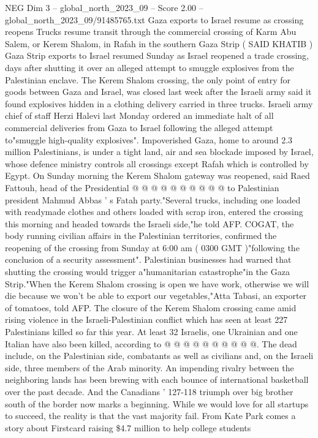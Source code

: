 \begin{textsample}{NEG Dim 3 – global\_north\_2023\_09 – Score 2.00 – global\_north\_2023\_09/91485765.txt}  \label{ex:f3_neg_410}
Gaza exports to Israel resume as crossing reopens Trucks resume transit through the commercial crossing of Karm Abu Salem, or Kerem Shalom, in Rafah in the southern Gaza Strip ( SAID KHATIB ) Gaza Strip exports to Israel resumed Sunday as Israel reopened a trade crossing, days after shutting it over an alleged attempt to smuggle explosives from the Palestinian enclave.
The Kerem Shalom crossing, the only point of entry for goods between Gaza and Israel, was closed last week after the Israeli army said it found explosives hidden in a clothing delivery carried in three trucks.
Israeli army chief of staff Herzi Halevi last Monday ordered an immediate halt of all commercial deliveries from Gaza to Israel following the alleged attempt to"smuggle high-quality explosives".
Impoverished Gaza, home to around 2.3 million Palestinians, is under a tight land, air and sea blockade imposed by Israel, whose defence ministry controls all crossings except Rafah which is controlled by Egypt.
On Sunday morning the Kerem Shalom gateway was reopened, said Raed Fattouh, head of the Presidential @ @ @ @ @ @ @ @ @ @ to Palestinian president Mahmud Abbas ' s Fatah party."Several trucks, including one loaded with readymade clothes and others loaded with scrap iron, entered the crossing this morning and headed towards the Israeli side,"he told AFP.
COGAT, the body running civilian affairs in the Palestinian territories, confirmed the reopening of the crossing from Sunday at 6:00 am ( 0300 GMT )"following the conclusion of a security assessment".
Palestinian businesses had warned that shutting the crossing would trigger a"humanitarian catastrophe"in the Gaza Strip."When the Kerem Shalom crossing is open we have work, otherwise we will die because we won't be able to export our vegetables,"Atta Tabasi, an exporter of tomatoes, told AFP.
The closure of the Kerem Shalom crossing came amid rising violence in the Israeli-Palestinian conflict which has seen at least 227 Palestinians killed so far this year.
At least 32 Israelis, one Ukrainian and one Italian have also been killed, according to @ @ @ @ @ @ @ @ @ @.
The dead include, on the Palestinian side, combatants as well as civilians and, on the Israeli side, three members of the Arab minority.
An impending rivalry between the neighboring lands has been brewing with each bounce of international basketball over the past decade.
And the Canadians ' 127-118 triumph over big brother south of the border now marks a beginning.
While we would love for all startups to succeed, the reality is that the vast majority fail.
From Kate Park comes a story about Firstcard raising \$4.7 million to help college students

\end{textsample}
